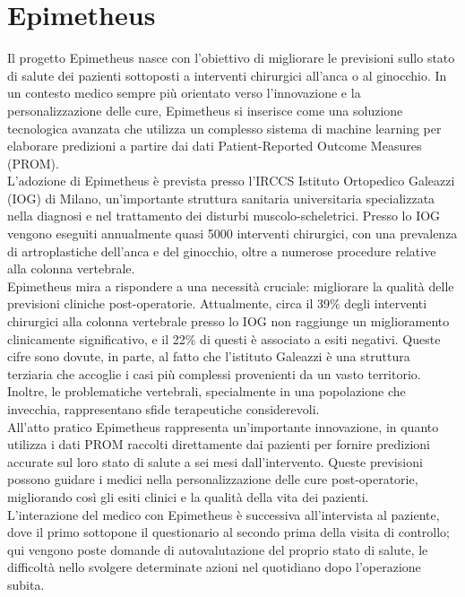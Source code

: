 \chapter{Epimetheus}
\label{cap:epimetheus}

Il progetto Epimetheus nasce con l'obiettivo di migliorare le previsioni sullo stato di salute dei pazienti sottoposti a interventi chirurgici all'anca o al ginocchio. In un contesto medico sempre più orientato verso l'innovazione e la personalizzazione delle cure, Epimetheus si inserisce come una soluzione tecnologica avanzata che utilizza un complesso sistema di machine learning per elaborare predizioni a partire dai dati Patient-Reported Outcome Measures (PROM).\\

L'adozione di Epimetheus è prevista presso l'IRCCS Istituto Ortopedico Galeazzi (IOG) di Milano, un'importante struttura sanitaria universitaria specializzata nella diagnosi e nel trattamento dei disturbi muscolo-scheletrici. Presso lo IOG vengono eseguiti annualmente quasi 5000 interventi chirurgici, con una prevalenza di artroplastiche dell'anca e del ginocchio, oltre a numerose procedure relative alla colonna vertebrale.\\

Epimetheus mira a rispondere a una necessità cruciale: migliorare la qualità delle previsioni cliniche post-operatorie. Attualmente, circa il 39\% degli interventi chirurgici alla colonna vertebrale presso lo IOG non raggiunge un miglioramento clinicamente significativo, e il 22\% di questi è associato a esiti negativi. Queste cifre sono dovute, in parte, al fatto che l'istituto Galeazzi è una struttura terziaria che accoglie i casi più complessi provenienti da un vasto territorio. Inoltre, le problematiche vertebrali, specialmente in una popolazione che invecchia, rappresentano sfide terapeutiche considerevoli.\\

All'atto pratico Epimetheus rappresenta un'importante innovazione, in quanto utilizza i dati PROM raccolti direttamente dai pazienti per fornire predizioni accurate sul loro stato di salute a sei mesi dall'intervento. Queste previsioni possono guidare i medici nella personalizzazione delle cure post-operatorie, migliorando così gli esiti clinici e la qualità della vita dei pazienti.\\

L'interazione del medico con Epimetheus è successiva all'intervista al paziente, dove il primo sottopone il questionario al secondo prima della visita di controllo; qui vengono poste domande di autovalutazione del proprio stato di salute, le difficoltà nello svolgere determinate azioni nel quotidiano dopo l'operazione subita.

